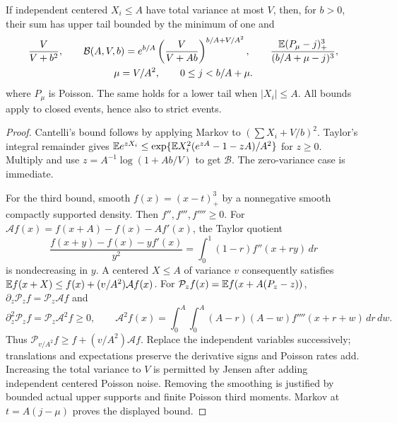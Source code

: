 \begin{lemma}\label{ms:fourier:cut49:shortloc:tails}
If independent centered $X_i\le A$ have total variance at most $V$, then,
for $b>0$, their sum has upper tail bounded by the minimum of one and
\begin{equation}\label{ms:fourier:cut49:shortloc:tailmin}
 \begin{gathered}
 \frac{V}{V+b^2},\qquad
 \mathcal B(A,V,b)=e^{b/A}\left(\frac{V}{V+Ab}\right)^{b/A+V/A^2},\qquad
 \frac{\mathbb E(P_\mu-j)_+^3}{(b/A+\mu-j)^3},\\
 \mu=V/A^2,\qquad 0\le j<b/A+\mu.
 \end{gathered}
\end{equation}
where $P_\mu$ is Poisson. The same holds for a lower tail when $|X_i|\le A$.
All bounds apply to closed events, hence also to strict events.
\end{lemma}
\begin{proof}
Cantelli's bound follows by applying Markov to $(\sum X_i+V/b)^2$.
Taylor's integral remainder gives
$\mathbb E e^{zX_i}\le\exp\{\mathbb E X_i^2(e^{zA}-1-zA)/A^2\}$
for $z\ge0$. Multiply and use $z=A^{-1}\log(1+Ab/V)$ to get $\mathcal B$.
The zero-variance case is immediate.

For the third bound, smooth $f(x)=(x-t)_+^3$ by a nonnegative smooth
compactly supported density. Then $f'',f''',f''''\ge0$. For
$\mathcal Af(x)=f(x+A)-f(x)-Af'(x)$, the Taylor quotient
\[
 \frac{f(x+y)-f(x)-yf'(x)}{y^2}
       =\int_0^1(1-r)f''(x+ry)\,dr
\]
is nondecreasing in $y$. A centered $X\le A$ of variance $v$ consequently
satisfies $\mathbb E f(x+X)\le f(x)+(v/A^2)\mathcal Af(x)$.
For $\mathcal P_zf(x)=\mathbb E f(x+A(P_z-z))$,
$\partial_z\mathcal P_zf=\mathcal P_z\mathcal Af$ and
\[
 \partial_z^2\mathcal P_zf=\mathcal P_z\mathcal A^2f\ge0,\qquad
 \mathcal A^2f(x)=\int_0^A\!\int_0^A(A-r)(A-w)f''''(x+r+w)\,dr\,dw.
\]
Thus $\mathcal P_{v/A^2}f\ge f+(v/A^2)\mathcal Af$. Replace the independent
variables successively; translations and expectations preserve the derivative
signs and Poisson rates add. Increasing the total variance to $V$ is permitted
by Jensen after adding independent centered Poisson noise. Removing the
smoothing is justified by bounded actual upper supports and finite Poisson
third moments. Markov at $t=A(j-\mu)$ proves the displayed bound.
\end{proof}

